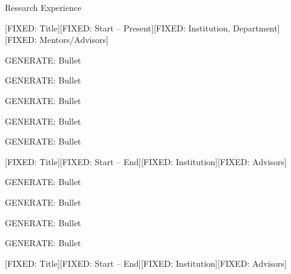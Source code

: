 \documentclass{cv}
\begin{document}

\begin{rSection}{Research Experience}

\begin{rSubsection}{[FIXED: Title]}{\textcolor{black!60}{[FIXED: Start -- Present]}}{[FIXED: Institution, Department]}{[FIXED: Mentors/Advisors]}

\item [GENERATE: Bullet]
\item [GENERATE: Bullet]
\item [GENERATE: Bullet]
\item [GENERATE: Bullet]
\item [GENERATE: Bullet]

\end{rSubsection}

\begin{rSubsection}{[FIXED: Title]}{\textcolor{black!60}{[FIXED: Start -- End]}}{[FIXED: Institution]}{[FIXED: Advisors]}

\item [GENERATE: Bullet]
\item [GENERATE: Bullet]
\item [GENERATE: Bullet]
\item [GENERATE: Bullet]

\end{rSubsection}

\begin{rSubsection}{[FIXED: Title]}{\textcolor{black!60}{[FIXED: Start -- End]}}{[FIXED: Institution]}{[FIXED: Advisors]}


\end{rSubsection}
\end{rSection}
\end{document}
